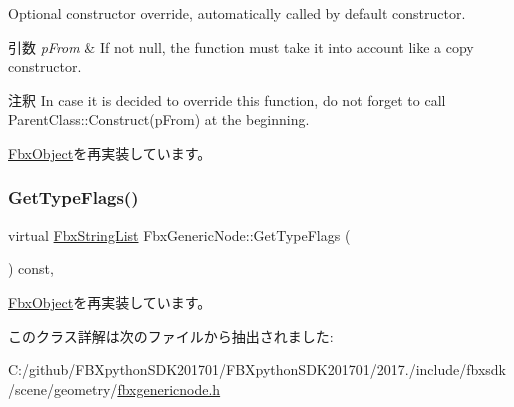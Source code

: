 Optional constructor override, automatically called by default constructor. 
\begin{DoxyParams}{引数}
{\em p\+From} & If not null, the function must take it into account like a copy constructor. \\
\hline
\end{DoxyParams}
\begin{DoxyRemark}{注釈}
In case it is decided to override this function, do not forget to call Parent\+Class\+::\+Construct(p\+From) at the beginning. 
\end{DoxyRemark}


\hyperlink{class_fbx_object_a313503bc645af3fdceb4a99ef5cea7eb}{Fbx\+Object}を再実装しています。

\mbox{\label{class_fbx_generic_node_a348566f1d9605e11b70a36cda95c9afb}} 
\subsubsection{\texorpdfstring{Get\+Type\+Flags()}{GetTypeFlags()}}
{\footnotesize\ttfamily virtual \hyperlink{class_fbx_string_list}{Fbx\+String\+List} Fbx\+Generic\+Node\+::\+Get\+Type\+Flags (\begin{DoxyParamCaption}{ }\end{DoxyParamCaption}) const\hspace{0.3cm}{\ttfamily [protected]}, {\ttfamily [virtual]}}



\hyperlink{class_fbx_object_a6d30a5d00400039a248977cf9f9255b2}{Fbx\+Object}を再実装しています。



このクラス詳解は次のファイルから抽出されました\+:\begin{DoxyCompactItemize}
\item 
C\+:/github/\+F\+B\+Xpython\+S\+D\+K201701/\+F\+B\+Xpython\+S\+D\+K201701/2017./include/fbxsdk/scene/geometry/\hyperlink{fbxgenericnode_8h}{fbxgenericnode.\+h}\end{DoxyCompactItemize}
